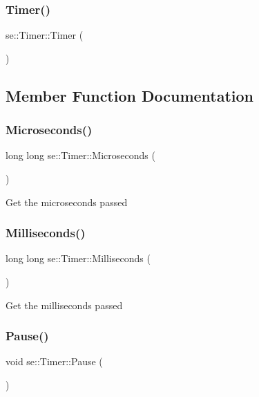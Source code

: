 \subsubsection{\texorpdfstring{Timer()}{Timer()}}
{\footnotesize\ttfamily se\+::\+Timer\+::\+Timer (\begin{DoxyParamCaption}{ }\end{DoxyParamCaption})}



\subsection{Member Function Documentation}
\mbox{\label{classse_1_1_timer_a7fdf38aafc8be894fc25764ff8cabb36}} 
\subsubsection{\texorpdfstring{Microseconds()}{Microseconds()}}
{\footnotesize\ttfamily long long se\+::\+Timer\+::\+Microseconds (\begin{DoxyParamCaption}{ }\end{DoxyParamCaption})}

Get the microseconds passed \mbox{\label{classse_1_1_timer_a9c3fe064b6637f2804c370da786a38d8}} 
\subsubsection{\texorpdfstring{Milliseconds()}{Milliseconds()}}
{\footnotesize\ttfamily long long se\+::\+Timer\+::\+Milliseconds (\begin{DoxyParamCaption}{ }\end{DoxyParamCaption})}

Get the milliseconds passed \mbox{\label{classse_1_1_timer_abde91d5d6e7fe0601c0c9607193707d8}} 
\subsubsection{\texorpdfstring{Pause()}{Pause()}}
{\footnotesize\ttfamily void se\+::\+Timer\+::\+Pause (\begin{DoxyParamCaption}{ }\end{DoxyParamCaption})}


